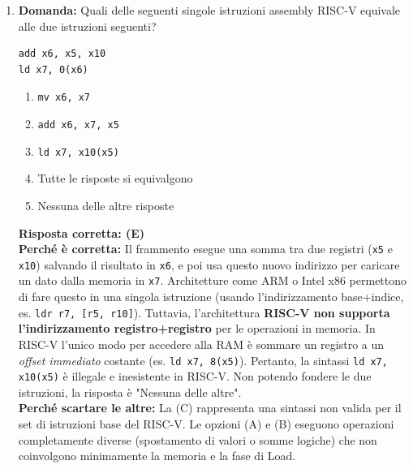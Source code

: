 \documentclass[12pt, a4paper]{article}
\begin{document}
\begin{enumerate}

    \item \textbf{Domanda:} Quali delle seguenti singole istruzioni assembly RISC-V equivale alle due istruzioni seguenti?
\begin{verbatim}
add x6, x5, x10
ld x7, 0(x6)
\end{verbatim}
    \begin{enumerate}[label=(\Alph*)]
        \item \texttt{mv x6, x7}
        \item \texttt{add x6, x7, x5}
        \item \texttt{ld x7, x10(x5)}
        \item Tutte le risposte si equivalgono
        \item Nessuna delle altre risposte
    \end{enumerate}

\newpage
    
    \textbf{Risposta corretta: (E)} \\
    \textbf{Perché è corretta:} Il frammento esegue una somma tra due registri (\texttt{x5} e \texttt{x10}) salvando il risultato in \texttt{x6}, e poi usa questo nuovo indirizzo per caricare un dato dalla memoria in \texttt{x7}. Architetture come ARM o Intel x86 permettono di fare questo in una singola istruzione (usando l'indirizzamento base+indice, es. \texttt{ldr r7, [r5, r10]}). Tuttavia, l'architettura \textbf{RISC-V non supporta l'indirizzamento registro+registro} per le operazioni in memoria. In RISC-V l'unico modo per accedere alla RAM è sommare un registro a un \textit{offset immediato} costante (es. \texttt{ld x7, 8(x5)}). Pertanto, la sintassi \texttt{ld x7, x10(x5)} è illegale e inesistente in RISC-V. Non potendo fondere le due istruzioni, la risposta è "Nessuna delle altre". \\
    \textbf{Perché scartare le altre:} La (C) rappresenta una sintassi non valida per il set di istruzioni base del RISC-V. Le opzioni (A) e (B) eseguono operazioni completamente diverse (spostamento di valori o somme logiche) che non coinvolgono minimamente la memoria e la fase di Load.


\end{enumerate}
\end{document}
